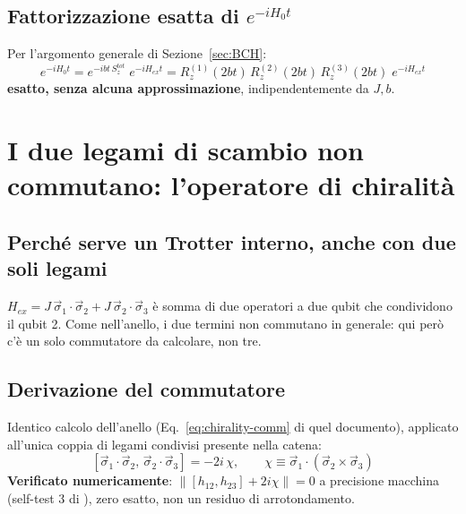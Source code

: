 \documentclass[11pt,a4paper]{article}
\begin{document}
\subsection{Fattorizzazione esatta di $e^{-iH_0t}$}

Per l'argomento generale di Sezione~\ref{sec:BCH}:
\begin{equation}
\boxed{e^{-iH_0t} = e^{-ibt\,S_z^{tot}}\; e^{-iH_{ex}t} = R_z^{(1)}(2bt)\,R_z^{(2)}(2bt)\,R_z^{(3)}(2bt)\;e^{-iH_{ex}t}}
\label{eq:H0-factor}
\end{equation}
\textbf{esatto, senza alcuna approssimazione}, indipendentemente da $J,b$.

\begin{center}
\end{center}

\section{I due legami di scambio non commutano: l'operatore di chiralità}
\label{sec:chirality}

\subsection{Perché serve un Trotter interno, anche con due soli legami}

$H_{ex}=J\,\vec\sigma_1\!\cdot\!\vec\sigma_2+J\,\vec\sigma_2\!\cdot\!\vec\sigma_3$ è somma di due operatori a due qubit che condividono il qubit 2. Come nell'anello, i due termini non commutano in generale: qui però c'è un solo commutatore da calcolare, non tre.

\subsection{Derivazione del commutatore}

Identico calcolo dell'anello (Eq.~\eqref{eq:chirality-comm} di quel documento), applicato all'unica coppia di legami condivisi presente nella catena:
\begin{equation}
\boxed{[\vec\sigma_1\!\cdot\!\vec\sigma_2,\,\vec\sigma_2\!\cdot\!\vec\sigma_3] = -2i\,\chi, \qquad \chi\equiv\vec\sigma_1\cdot(\vec\sigma_2\times\vec\sigma_3)}
\label{eq:chirality-comm}
\end{equation}
\textbf{Verificato numericamente}: $\|[h_{12},h_{23}]+2i\chi\|=0$ a precisione macchina (self-test 3 di \texttt{}), zero esatto, non un residuo di arrotondamento.
\end{document}
